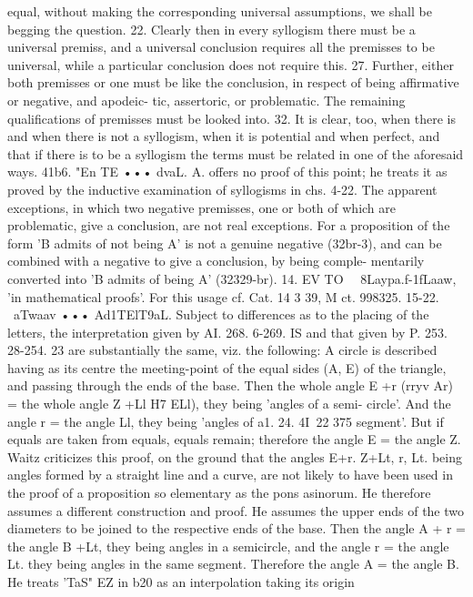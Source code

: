 {{{{{{{{{{{{{{equal, without making the corresponding universal assumptions,
we shall be begging the question.
22. Clearly then in every syllogism there must be a universal
premiss, and a universal conclusion requires all the premisses to
be universal, while a particular conclusion does not require this.
27. Further, either both premisses or one must be like the
conclusion, in respect of being affirmative or negative, and apodeic-
tic, assertoric, or problematic. The remaining qualifications of
premisses must be looked into.
32. It is clear, too, when there is and when there is not a
syllogism, when it is potential and when perfect, and that if there
is to be a syllogism the terms must be related in one of the
aforesaid ways.
41b6. "En TE ••• dvaL. A. offers no proof of this point; he
treats it as proved by the inductive examination of syllogisms
in chs. 4-22. The apparent exceptions, in which two negative
premisses, one or both of which are problematic, give a conclusion,
are not real exceptions. For a proposition of the form 'B admits
of not being A' is not a genuine negative (32br-3), and can be
combined with a negative to give a conclusion, by being comple-
mentarily converted into 'B admits of being A' (32329-br).
14. EV TO~~ 8Laypa.f-1fLaaw, 'in mathematical proofs'. For this
usage cf. Cat. 14 3 39, M ct. 998325.
15-22. ~aTwaav ••• Ad1TElT9aL. Subject to differences as to the
placing of the letters, the interpretation
given by AI. 268. 6-269. IS and that given
by P. 253. 28-254. 23 are substantially
the same, viz. the following: A circle
is described having as its centre the
meeting-point of the equal sides (A, E)
of the triangle, and passing through the
ends of the base. Then the whole angle
E +r (rryv Ar) = the whole angle Z +Ll
H7 ELl), they being 'angles of a semi-
circle'. And the angle r = the angle Ll, they being 'angles of a1. 24. 4I~22
375
segment'. But if equals are taken from equals, equals remain;
therefore the angle E = the angle Z.
Waitz criticizes this proof, on the ground that the angles
E+r. Z+Lt, r, Lt. being angles formed by a straight line and a
curve, are not likely to have been used in the proof of a proposition
so elementary as the pons asinorum. He therefore assumes a
different construction and proof. He assumes the upper ends of
the two diameters to be joined to the respective ends of the base.
Then the angle A + r = the angle B +Lt,
they being angles in a semicircle, and the
angle r = the angle Lt. they being angles
in the same segment. Therefore the angle
A = the angle B. He treats 'TaS" EZ in
b20 as an interpolation taking its origin
}}}}}}}}}}}}}}
